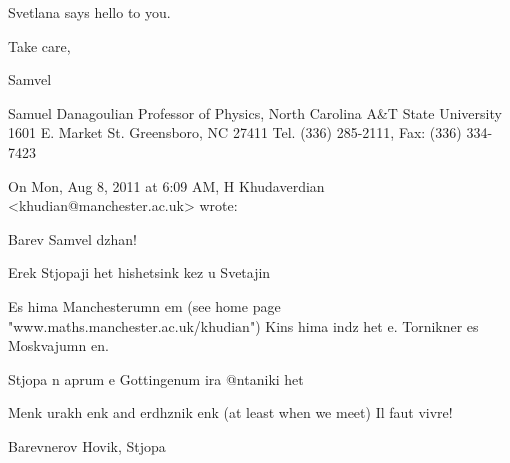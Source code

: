 Svetlana says hello to you.

Take care,

Samvel



Samuel Danagoulian
Professor of Physics,
North Carolina A&T State University
1601 E. Market St. Greensboro, NC 27411
Tel. (336) 285-2111, Fax: (336) 334-7423





On Mon, Aug 8, 2011 at 6:09 AM, H Khudaverdian
<khudian@manchester.ac.uk> wrote:

        Barev Samvel dzhan!

       Erek Stjopaji het hishetsink kez u
      Svetajin

       Es hima Manchesterumn em
      (see home page
      "www.maths.manchester.ac.uk/khudian")
      Kins hima indz het e. Tornikner es
      Moskvajumn en.

       Stjopa n aprum e Gottingenum ira
      @ntaniki het

       Menk urakh enk and erdhznik enk (at
      least when we meet)
        Il faut vivre!

        Barevnerov
             Hovik, Stjopa
